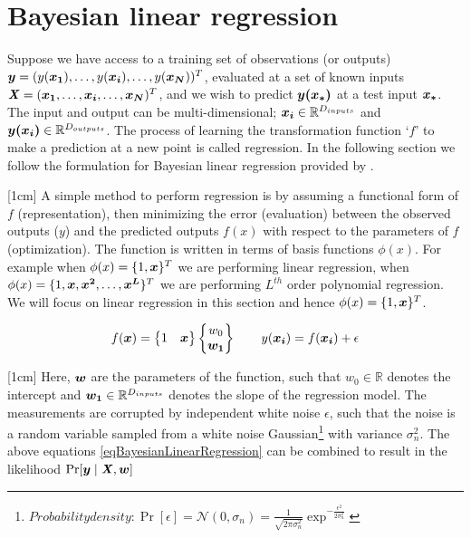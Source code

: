 \section{Bayesian linear regression}\label{secBayesianModelling}
\sloppy Suppose we have access to a training set of observations (or outputs) $\boldsymbol{y} = (y(\boldsymbol{x_{1}}), \ldots , y(\boldsymbol{x_{i}}), \ldots , y(\boldsymbol{x_{N}}))^T$, evaluated at a set of known inputs $\bm{\mathit{X}} = (\boldsymbol{x_{1}}, \ldots , \boldsymbol{x_{i}}, \ldots, \boldsymbol{x_{N}})^T$, and we wish to predict $\boldsymbol{y(x_{*})}$ at a test input $\boldsymbol{x_{*}}$. The input and output can be multi-dimensional; $\boldsymbol{x_{i}} \in \mathbb{R}^{D_{inputs}}$ and $\boldsymbol{y(x_{i})} \in \mathbb{R}^{D_{outputs}}$. The process of learning the transformation function `$f$' to make a prediction at a new point is called regression. In the following section we follow the formulation for Bayesian linear regression provided by \cite{mackay2003information}.

[1cm]
A simple method to perform regression is by assuming a functional form of $f$ (representation), then minimizing the error (evaluation) between the observed outputs ($y$) and the predicted outputs $f(x)$ with respect to the parameters of $f$ (optimization). The function is written in terms of basis functions $\phi(x)$. For example when $\phi(x) = \{1, \boldsymbol{x}\}^{T}$ we are performing linear regression, when $\phi(x) = \{1, \boldsymbol{x}, \boldsymbol{x^{2}}, \ldots, \boldsymbol{x^{L}}\}^{T}$ we are performing $L^{th}$ order polynomial regression. We will focus on linear regression in this section and hence $\phi(x) = \{1, \boldsymbol{x}\}^{T}$.

\begin{equation}\label{eqBayesianLinearRegression}
f(\boldsymbol{x}) = \begin{Bmatrix}
1 & \boldsymbol{x}
\end{Bmatrix}  \begin{Bmatrix}
w_{0}\\ 
\boldsymbol{w_{1}}
\end{Bmatrix}
\quad \quad y(\boldsymbol{x_{i}}) = f(\boldsymbol{x_{i}}) + \epsilon
\end{equation}

[1cm]
Here, $\boldsymbol{w}$ are the parameters of the function, such that $w_{0} \in \mathbb{R}$ denotes the intercept and $\boldsymbol{w_{1}} \in \mathbb{R}^{D_{inputs}}$ denotes the slope of the regression model. The measurements are corrupted by independent white noise $\epsilon$, such that the noise is a random variable sampled from a white noise Gaussian\footnote{$Probability density: \Pr[\epsilon] = \mathcal{N}(0, \sigma_{n}) = \frac{1}{\sqrt{2\pi\sigma_{n}^{2}}}\exp^{-\frac{\epsilon^{2}}{2\sigma_{n}^{2}}}
$} with variance $\sigma_{n}^{2}$. The above equations \ref{eqBayesianLinearRegression} can be combined to result in the likelihood $\Pr[\boldsymbol{y} \mid \bm{\mathit{X}}, \boldsymbol{w}]$

